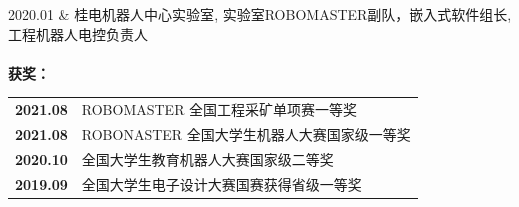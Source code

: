 
\begin{experiences}
	\faPlayCircleO \textsc{2020.01} & \textsc{桂电机器人中心实验室}, \textsc{实验室ROBOMASTER副队，嵌入式软件组长, 工程机器人电控负责人} \\ 
	
	\\[0.0cm]
	\textbf{获奖：}
	\begin{tabular}{@{}l l@{}}
		\qquad\qquad \textbf{2021.08 } & ROBOMASTER 全国工程采矿单项赛一等奖 \\
		\qquad\qquad \textbf{2021.08 } & ROBONASTER 全国大学生机器人大赛国家级一等奖 \\
		\qquad\qquad \textbf{2020.10 } & 全国大学生教育机器人大赛国家级二等奖 \\
		\qquad\qquad \textbf{2019.09 } & 全国大学生电子设计大赛国赛获得省级一等奖 \\
	\end{tabular}
	
\end{experiences}
